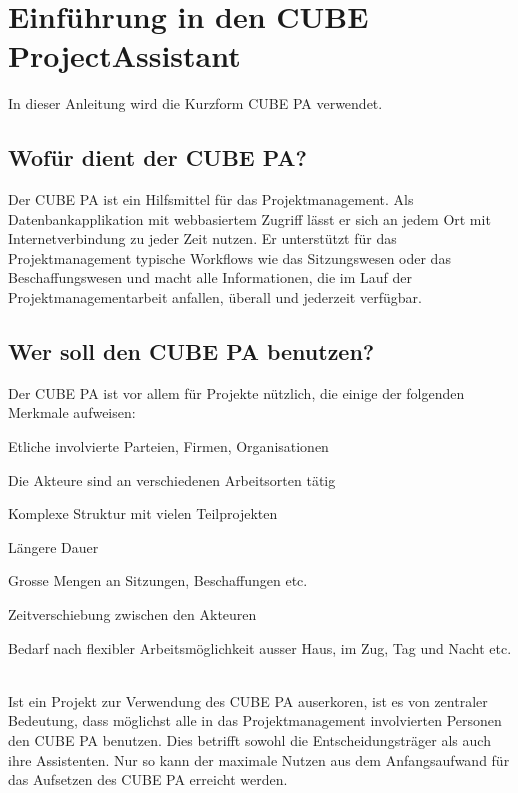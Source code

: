 
\section{Einführung in den CUBE ProjectAssistant} %

In dieser Anleitung wird die Kurzform CUBE PA verwendet.

\subsection{Wofür dient der CUBE PA?} %

Der CUBE PA ist ein Hilfsmittel für das Projektmanagement. Als Datenbankapplikation mit webbasiertem Zugriff lässt er sich an jedem Ort mit Internetverbindung zu jeder Zeit nutzen. Er unterstützt für das Projektmanagement typische Workflows wie das Sitzungswesen oder das Beschaffungswesen und macht alle Informationen, die im Lauf der Projektmanagementarbeit anfallen, überall und jederzeit verfügbar.

\subsection{Wer soll den CUBE PA benutzen?} %

Der CUBE PA ist vor allem für Projekte nützlich, die einige der folgenden Merkmale aufweisen:

	
\begin{compactitem}
	\item Etliche involvierte Parteien, Firmen, Organisationen
	\item Die Akteure sind an verschiedenen Arbeitsorten tätig
	\item Komplexe Struktur mit vielen Teilprojekten
	\item Längere Dauer
	\item Grosse Mengen an Sitzungen, Beschaffungen etc.
	\item Zeitverschiebung zwischen den Akteuren
	\item Bedarf nach flexibler Arbeitsmöglichkeit ausser Haus, im Zug, Tag und Nacht etc.
\end{compactitem}	
		
\ \\
Ist ein Projekt zur Verwendung des CUBE PA auserkoren, ist es von zentraler Bedeutung, dass möglichst alle in das Projektmanagement involvierten Personen den CUBE PA benutzen. Dies betrifft sowohl die Entscheidungsträger als auch ihre Assistenten. Nur so kann der maximale Nutzen aus dem Anfangsaufwand für das Aufsetzen des CUBE PA erreicht werden.
	
